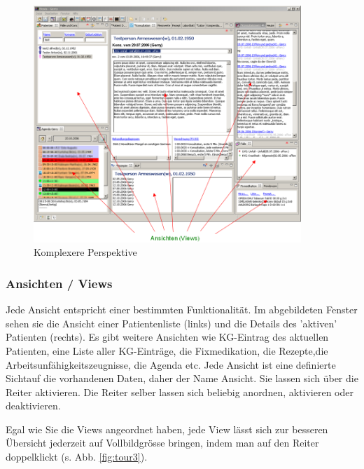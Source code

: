 \begin{figure}[htp]
\begin{center}
  \includegraphics[width=0.9\textwidth]{images/tour2}
  \caption{Komplexere Perspektive}
  \label{fig:tour2}
\end{center}
\end{figure}

\subsubsection{Ansichten / Views}
Jede Ansicht entspricht einer bestimmten Funktionalität. Im abgebildeten Fenster sehen sie die Ansicht einer Patientenliste (links) und die Details des 'aktiven' Patienten (rechts). Es gibt weitere Ansichten wie KG-Eintrag des aktuellen Patienten, eine Liste aller KG-Einträge, die Fixmedikation, die Rezepte,die Arbeitsunfähigkeitszeugnisse,
die Agenda etc. Jede Ansicht ist eine definierte \glqq Sicht\grqq auf die vorhandenen Daten, daher der Name \glqq Ansicht\grqq. Sie lassen sich über die Reiter aktivieren. Die Reiter selber lassen sich beliebig anordnen, aktivieren oder deaktivieren.

Egal wie Sie die Views angeordnet haben, jede View lässt sich zur besseren
Übersicht jederzeit auf Vollbildgrösse bringen, indem man auf den Reiter
doppelklickt (s. Abb. \ref{fig:tour3}).

